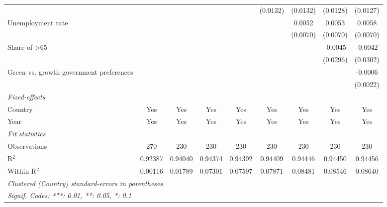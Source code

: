 \begin{table}[htbp]
\begin{tabular}{lcccccccc}
                                                             &          &          &                &                & (0.0132)       & (0.0132)       & (0.0128)       & (0.0127)\\   
      Unemployment rate                                      &          &          &                &                &                & 0.0052         & 0.0053         & 0.0058\\   
                                                             &          &          &                &                &                & (0.0070)       & (0.0070)       & (0.0070)\\   
      Share of >65                                           &          &          &                &                &                &                & -0.0045        & -0.0042\\   
                                                             &          &          &                &                &                &                & (0.0296)       & (0.0302)\\   
      Green vs. growth government preferences                &          &          &                &                &                &                &                & -0.0006\\   
                                                             &          &          &                &                &                &                &                & (0.0022)\\   
      \midrule
      \emph{Fixed-effects}\\
      Country                                                & Yes      & Yes      & Yes            & Yes            & Yes            & Yes            & Yes            & Yes\\  
      Year                                                   & Yes      & Yes      & Yes            & Yes            & Yes            & Yes            & Yes            & Yes\\  
      \midrule
      \emph{Fit statistics}\\
      Observations                                           & 270      & 230      & 230            & 230            & 230            & 230            & 230            & 230\\  
      R$^2$                                                  & 0.92387  & 0.94040  & 0.94374        & 0.94392        & 0.94409        & 0.94446        & 0.94450        & 0.94456\\  
      Within R$^2$                                           & 0.00116  & 0.01789  & 0.07301        & 0.07597        & 0.07871        & 0.08481        & 0.08546        & 0.08640\\  
      \midrule \midrule
      \multicolumn{9}{l}{\emph{Clustered (Country) standard-errors in parentheses}}\\
      \multicolumn{9}{l}{\emph{Signif. Codes: ***: 0.01, **: 0.05, *: 0.1}}\\
   \end{tabular}
\end{table}


